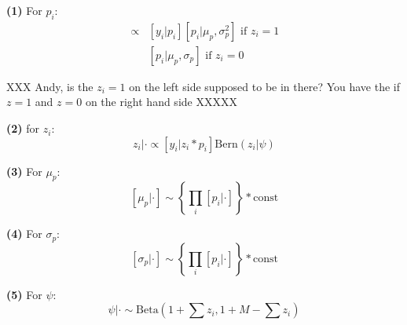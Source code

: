 {\bf (1)} For $p_{i}$:
\begin{eqnarray*}
[p_{i}|y_{i}, \mu_p, \sigma_{p},z_{i}=1] &\propto  &
[y_{i}|p_{i}][p_{i}|\mu_p,\sigma_{p}^{2}] \mbox{ if $z_{i}=1$ }  \\
                 &  &  [p_{i}|\mu_p,\sigma_{p}] \mbox{ if $z_{i}=0$ }
\end{eqnarray*}

XXX Andy, is the $z_i = 1$ on the left side supposed to be in there? You have the if $z=1$ and $z=0$ on the right hand side XXXXX

{\bf (2)} for $z_{i}$:
\[
z_{i} | \cdot \propto [y_{i}|z_{i}*p_{i}] \mbox{Bern}(z_{i}|\psi)
\]

{\bf (3)} For $\mu_{p}$:
\[
[\mu_{p} | \cdot ] \sim \left\{ \prod_{i} [p_{i}| \cdot] \right\} *\mbox{const}
\]


{\bf (4)} For $\sigma_{p}$:
\[
[ \sigma_{p}|\cdot ] \sim \left\{ \prod_{i}[p_{i}| \cdot ] \right\} *\mbox{const}
\]

{\bf (5)} For $\psi$:
\[
\psi|\cdot\sim \mbox{Beta}(1 + \sum z_{i}, 1 + M - \sum z_{i})
\]



